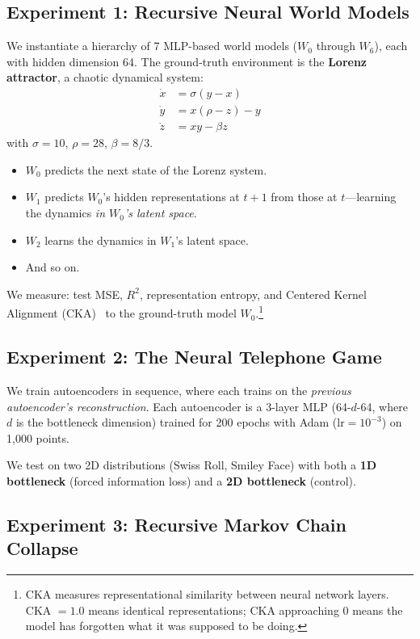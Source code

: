 \documentclass[11pt, twocolumn]{article}
\begin{document}
\subsection{Experiment 1: Recursive Neural World Models}

We instantiate a hierarchy of 7 MLP-based world models ($W_0$ through $W_6$), each with hidden dimension 64. The ground-truth environment is the \textbf{Lorenz attractor}, a chaotic dynamical system:
\begin{align}
    \dot{x} &= \sigma(y - x) \\
    \dot{y} &= x(\rho - z) - y \\
    \dot{z} &= xy - \beta z
\end{align}
with $\sigma = 10$, $\rho = 28$, $\beta = 8/3$.

\begin{itemize}[nosep]
    \item $W_0$ predicts the next state of the Lorenz system.
    \item $W_1$ predicts $W_0$'s hidden representations at $t{+}1$ from those at $t$---learning the dynamics \textit{in $W_0$'s latent space}.
    \item $W_2$ learns the dynamics in $W_1$'s latent space.
    \item And so on.
\end{itemize}

We measure: test MSE, $R^2$, representation entropy, and Centered Kernel Alignment (CKA)~\cite{kornblith2019} to the ground-truth model $W_0$.\footnote{CKA measures representational similarity between neural network layers. CKA $= 1.0$ means identical representations; CKA approaching 0 means the model has forgotten what it was supposed to be doing.}

\subsection{Experiment 2: The Neural Telephone Game}

We train autoencoders in sequence, where each trains on the \textit{previous autoencoder's reconstruction}. Each autoencoder is a 3-layer MLP (64-$d$-64, where $d$ is the bottleneck dimension) trained for 200 epochs with Adam ($\text{lr} = 10^{-3}$) on 1{,}000 points.

We test on two 2D distributions (Swiss Roll, Smiley Face) with both a \textbf{1D bottleneck} (forced information loss) and a \textbf{2D bottleneck} (control).

\subsection{Experiment 3: Recursive Markov Chain Collapse}
\end{document}
